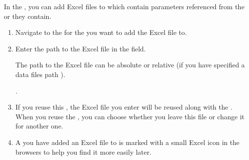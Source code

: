 In the \gdpropview{}, you can add Excel files to \gdcases{} which contain parameters referenced from the \gdcases{} or \gdsteps{} they contain. 
\begin{enumerate}
\item Navigate to the \gdpropview{} for the \gdcase{} you want to add the Excel file to. 
\item Enter the path to the Excel file in the  field. 

The path to the Excel file can be absolute or relative (if you have specified a data files path ).

.

\item If you reuse this \gdcase{}, the Excel file you enter will be reused along with the \gdcase{}. When you reuse the \gdcase{}, you can choose whether you leave this file or change it for another one. 
\item A \gdcase{} you have added an Excel file to is marked with a small Excel icon in the browsers to help you find it more easily later. 
\end{enumerate}


